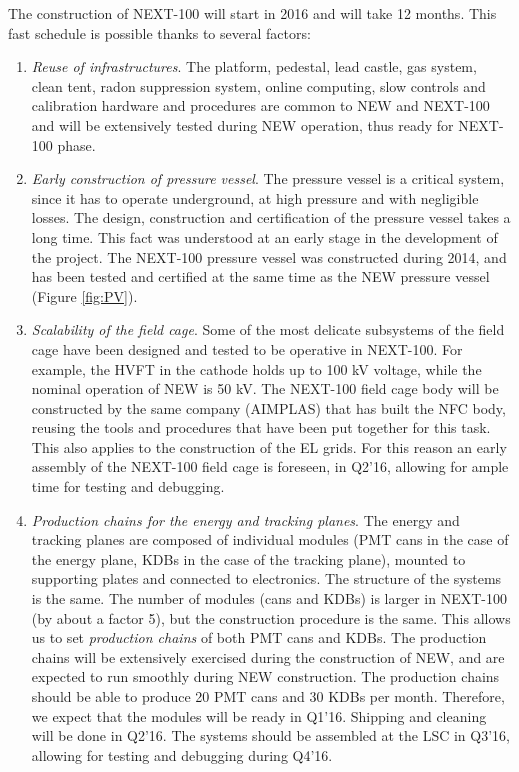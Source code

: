 The construction of NEXT-100 will start in 2016 and will take 12 months. This fast schedule is possible thanks to several factors:
%
\begin{enumerate}
\item {\em Reuse of infrastructures}.
The platform, pedestal, lead castle, gas system, clean tent, radon suppression system, online computing, slow controls and calibration hardware and procedures are common to NEW and NEXT-100 and will be extensively tested during NEW operation, thus ready for NEXT-100 phase.
\item {\em Early construction of pressure vessel}. 
The pressure vessel is a critical system, since it has to operate underground, at high pressure and with negligible losses. The design, construction and certification of the pressure vessel takes a long time. This fact was understood at an early stage in the development of the project. The NEXT-100 pressure vessel was constructed during 2014, and has been tested and certified at the same time as the NEW pressure vessel (Figure \ref{fig:PV}). 
\item {\em Scalability of the field cage}. 
Some of the most delicate subsystems of the field cage have been designed and tested to be operative in NEXT-100. For example, the HVFT in the cathode holds up to 100 kV voltage, while the nominal operation of NEW is 50 kV. The NEXT-100 field cage body will be constructed by the same company (AIMPLAS) that has built the NFC body, reusing the tools and procedures that have been put together for this task. This also applies to the construction of the EL grids. For this reason an early assembly of the NEXT-100 field cage is foreseen, in Q2'16, allowing for ample time for testing and debugging.

\item {\em Production chains for the energy and tracking planes}. 
The energy and tracking planes are composed of individual modules (PMT cans in the case of the energy plane, KDBs in the case of the tracking plane), mounted to supporting plates and connected to electronics. The structure of the systems is the same. The number of modules (cans and KDBs) is larger in NEXT-100 (by about a factor 5), but the construction procedure is the same. This allows us to set {\em production chains} of both PMT cans and KDBs. The production chains will be extensively exercised during the construction of NEW, and are expected to run smoothly during NEW construction. The production chains should be able to produce 20 PMT cans and 30 KDBs per month. Therefore, we expect that the modules will be ready in Q1'16. Shipping and cleaning will be done in Q2'16. The systems should be assembled at the LSC in Q3'16, allowing for testing and debugging during Q4'16.
\end{enumerate}